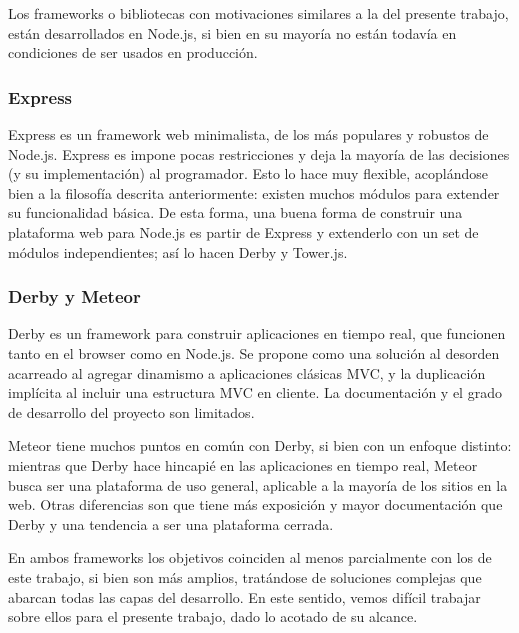 \documentclass[doc,helv,longtable]{article}
\begin{document}
Los frameworks o bibliotecas con motivaciones similares a la del presente trabajo, están desarrollados en Node.js, si bien en su mayoría no están todavía en condiciones de ser usados en producción\cite{nodeodd}\cite{nodefws}.

\subsubsection{Express}
Express\cite{express} es un framework web minimalista, de los más populares y robustos de Node.js.  Express es impone pocas restricciones y deja la mayoría de las decisiones (y su implementación) al programador\cite{nodefws}. Esto lo hace muy flexible, acoplándose bien a la filosofía descrita anteriormente: existen muchos módulos para extender su funcionalidad básica. De esta forma, una buena forma de construir una plataforma web para Node.js es partir de Express y extenderlo con un set de módulos independientes; así lo hacen Derby y Tower.js\cite{tower}.

\subsubsection{Derby y Meteor}
Derby es un framework para construir aplicaciones en tiempo real, que funcionen tanto en el browser como en Node.js. Se propone como una solución al desorden acarreado al agregar dinamismo a aplicaciones clásicas MVC, y la duplicación implícita al incluir una estructura MVC en cliente\cite{derby}. La documentación y el grado de desarrollo del proyecto son limitados\cite{nodefws}.

Meteor\cite{meteor} tiene muchos puntos en común con Derby, si bien con un enfoque distinto: mientras que Derby hace hincapié en las aplicaciones en tiempo real, Meteor busca ser una plataforma de uso general, aplicable a la mayoría de los sitios en la web\cite{derbymeteor}. Otras diferencias son que tiene más exposición y mayor documentación que Derby\cite{derbyrant1} y una tendencia a ser una plataforma cerrada\cite{derbyrant2}.

En ambos frameworks los objetivos coinciden al menos parcialmente con los de este trabajo, si bien son más amplios, tratándose de soluciones complejas que abarcan todas las capas del desarrollo. En este sentido, vemos difícil trabajar sobre ellos para el presente trabajo, dado lo acotado de su alcance.
\end{document}
